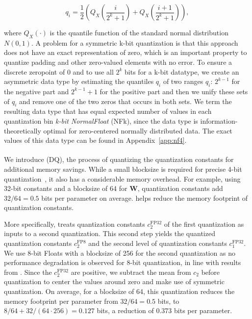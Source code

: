 \begin{equation}
q_i  = \frac{1}{2}\left( Q_X\left(\frac{i}{2^k+1}\right) + Q_X\left(\frac{i+1}{2^k+1}\right)\right),
\end{equation}

\noindent

where $Q_X(\cdot)$ is the quantile function of the standard normal distribution $N(0,1)$. A problem for a symmetric k-bit quantization is that this approach does not have an exact representation of zero, which is an important property to quantize padding and other zero-valued elements with no error. To ensure a discrete zeropoint of $0$ and to use all $2^k$ bits for a k-bit datatype, we create an asymmetric data type by estimating the quantiles $q_i$ of two ranges $q_i$: $2^{k-1}$ for the negative part and $2^{k-1}+1$ for the positive part and then we unify these sets of $q_i$ and remove one of the two zeros that occurs in both sets. We term the resulting data type that has equal expected number of values in each quantization bin \emph{k-bit NormalFloat} (NFk), since the data type is information-theoretically optimal for zero-centered normally distributed data. The exact values of this data type can be found in Appendix~\ref{app:nf4}.

\paragraph{\Doublequant{}} 
We introduce \emph{\Doublequant} (DQ), the process of quantizing the quantization constants for additional memory savings.
While a small blocksize is required for precise 4-bit quantization~\citep{dettmers2022case}, it also has a considerable memory overhead. For example, using 32-bit constants and a blocksize of 64 for $\mathbf{W}$, quantization constants add $32/64 = 0.5$ bits per parameter on average. \Doublequant helps reduce the memory footprint of quantization constants.


More specifically, \Doublequant treats quantization constants $c_2^{\text{FP32}}$ of the first quantization as inputs to a second quantization. This second step yields the quantized quantization constants $c_2^{\text{FP8}}$ and the second level of quantization constants $c_1^{\text{FP32}}$. We use 8-bit Floats with a blocksize of 256 for the second quantization as no performance degradation is observed for 8-bit quantization, in line with results from \citet{dettmers2022case}. 
Since the $c_2^{\text{FP32}}$ are positive, we subtract the mean from $c_2$ before quantization to center the values around zero and make use of symmetric quantization. On average, for a blocksize of 64, this quantization reduces the memory footprint per parameter from $32/64=0.5$ bits, to $8/64 + 32/(64\cdot256) = 0.127$ bits, a reduction of 0.373 bits per parameter. 

